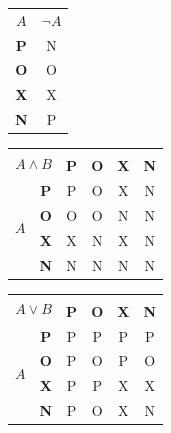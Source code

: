 \documentclass[11pt]{article}
\begin{document}
            \begin{table}[h] 
                \centering 
                \begin{tabular}{|c|c|}
                    \hline
                    $A$ & $\neg A$ \\ \cline{1-2}
                    \textbf{P} & N \\ \cline{1-2}
                    \textbf{O} & O \\ \cline{1-2}
                    \textbf{X} & X \\ \cline{1-2}
                    \textbf{N} & P \\ \cline{1-2}
                    \hline
                \end{tabular}
                \begin{tabular}{|c|>{\bfseries}c|c|c|c|c|}
                    \hline 
                    \multicolumn{2}{|c|}{\multirow{2}{*}{$A \land B$}}&\multicolumn{4}{|c|}{$B$}\\\cline{3-6}
                    \multicolumn{2}{|c|}{} & \textbf{P} & \textbf{O} & \textbf{X} & \textbf{N} \\ 
                    \hline 
                    \multirow{4}{*}{$A$}
                    & \textbf{P}  &  P & O & X & N  \\\cline{2-6} 
                    & \textbf{O}  &  O & O & N & N  \\\cline{2-6}
                    & \textbf{X}  &  X & N & X & N  \\\cline{2-6}
                    & \textbf{N}  &  N & N & N & N  \\\cline{2-6}
                    \hline 
                \end{tabular}
                \begin{tabular}{|c|>{\bfseries}c|c|c|c|c|}
                    \hline 
                    \multicolumn{2}{|c|}{\multirow{2}{*}{$A \lor B$}}&\multicolumn{4}{|c|}{$B$}\\\cline{3-6}
                    \multicolumn{2}{|c|}{} & \textbf{P} & \textbf{O} & \textbf{X} & \textbf{N} \\ 
                    \hline 
                    \multirow{4}{*}{$A$}
                    & \textbf{P}  &  P & P & P & P  \\\cline{2-6} 
                    & \textbf{O}  &  P & O & P & O  \\\cline{2-6}
                    & \textbf{X}  &  P & P & X & X  \\\cline{2-6}
                    & \textbf{N}  &  P & O & X & N  \\\cline{2-6}

\end{tabular}
\end{table}
\end{document}
